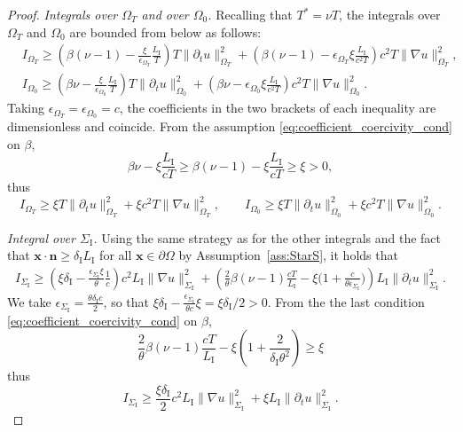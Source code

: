 \documentclass[a4paper]{article}
\theoremstyle{plain}
\theoremstyle{definition}
\newcommand{\norm}[1]{\|#1\|}
\newcommand{\Grad}[1]{\nabla #1}
\newcommand{\TimeDer}{{\partial^{}_t}}
\newcommand{\vect}[1]{\bm{#1}}
\newcommand{\LI}{L_{\mathrm I}}
\newcommand{\deltaI}{{\delta_{\mathrm I}}}
\newcommand{\SI}{{\Sigma_{\mathrm I}}}
\newcommand{\OT}{{\Omega_T}}
\newcommand{\OZ}{{\Omega_0}}
\begin{document}
\begin{proof}
	\textit{Integrals over $\OT$ and over $\OZ$.}
	Recalling that $T^* = \nu T$, the integrals over $\OT$ and $\OZ$ are bounded from below as follows:
	\begin{align*}
		 & I_\OT\geq \left(
		\beta (\nu-1) - \frac{\xi}{\epsilon_{\Omega_T}}\frac{\LI}{T}
		\right) T \norm{\TimeDer{u}}^2_{\OT}
		+ \left(\beta (\nu-1) - \epsilon_{\Omega_T} \xi \frac{\LI}{c^2 T}
		\right) c^2 T \norm{\Grad u}^2_{\OT},
		\\
		 & I_\OZ\geq \left(
		\beta \nu - \frac{\xi}{\epsilon_{\Omega_0}} \frac{\LI}{T}
		\right) T \norm{\TimeDer{u}}^2_{\OZ}
		+ \left(
		\beta \nu - \epsilon_{\Omega_0} \xi \frac{\LI}{c^2 T}
		\right) c^2 T \norm{\Grad u}^2_{\OZ}.
	\end{align*}
	Taking $\epsilon_{\Omega_T} = \epsilon_{\Omega_0} = c$, the coefficients in the two brackets of each inequality are dimensionless and coincide.
From the assumption \eqref{eq:coefficient_coercivity_cond} on $\beta$,
\begin{equation*}
		\beta \nu - \xi \frac{\LI}{cT} \geq \beta (\nu - 1) - \xi \frac{\LI}{cT} \geq \xi > 0,
	\end{equation*}
	thus
	\begin{equation}\label{eq:coerc:OTOZ}
		I_\OT\geq \xi T \norm{\TimeDer{u}}^2_\OT+\xi c^2 T \norm{\Grad u}^2_\OT,\qquad
		I_\OZ\geq \xi T \norm{\TimeDer{u}}^2_\OZ+\xi c^2 T \norm{\Grad u}^2_\OZ.
	\end{equation}


	\textit{Integral over ${\SI}$.}
	Using the same strategy as for the other integrals and the fact that $\vect{x} \cdot \vect{n} \geq \deltaI \LI$ for all $\vect{x} \in \partial {\Omega}$ by Assumption~\ref{ass:StarS}, it holds that
	\begin{align*}
		I_{\SI} \geq \left(
		\xi \deltaI - \frac{\epsilon_\SI \xi}{\theta} \frac{1}{c}
		\right) c^2 \LI \norm{\Grad u}^2_{{\SI}}
		+ \left(
		\frac2\theta \beta (\nu - 1) \frac{cT}{\LI} - \xi \Big(1 + \frac{c}{\theta \epsilon_{\SI}}\Big)
		\right) \LI \norm{\TimeDer{u}}_{{\SI}}^2.
	\end{align*}
	We take $\epsilon_{\SI} = \frac{\theta \deltaI c}{2}$, so that $ \xi \deltaI - \frac{\epsilon_{\SI}}{\theta c} \xi = \xi\deltaI/2 > 0$. From the the last condition \eqref{eq:coefficient_coercivity_cond} on $\beta$,
	\begin{equation*}
			\frac2\theta  \beta (\nu - 1) \frac{cT}{\LI} - \xi \left(1 + \frac{2}{\deltaI \theta^2} \right)
\geq \xi
	\end{equation*}
	thus
	\begin{equation}\label{eq:coerc:S}
		I_{\SI}\ge \frac{\xi\deltaI}2 c^2 \LI \norm{\Grad u}^2_{{\SI}}  + \xi \LI \norm{\TimeDer{u}}_{{\SI}}^2.
	\end{equation}


\end{proof}
\end{document}
